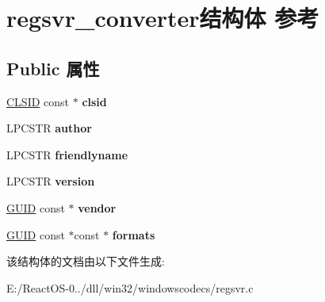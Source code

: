 \hypertarget{structregsvr__converter}{}\section{regsvr\+\_\+converter结构体 参考}
\label{structregsvr__converter}
\subsection*{Public 属性}
\begin{DoxyCompactItemize}
\item 
\mbox{\label{structregsvr__converter_af1c59fced290455be06f327f08106593}} 
\hyperlink{struct___i_i_d}{C\+L\+S\+ID} const  $\ast$ {\bfseries clsid}
\item 
\mbox{\label{structregsvr__converter_a3e6404e6264b00d4ccb28010d00ecdde}} 
L\+P\+C\+S\+TR {\bfseries author}
\item 
\mbox{\label{structregsvr__converter_ac96618e756b82cc919429cf492984a81}} 
L\+P\+C\+S\+TR {\bfseries friendlyname}
\item 
\mbox{\label{structregsvr__converter_a6bc5b746bdb5a6b4dfba9e1107fe22a5}} 
L\+P\+C\+S\+TR {\bfseries version}
\item 
\mbox{\label{structregsvr__converter_a77a91f97f7fcf1a7470c7304fdfd4e98}} 
\hyperlink{interface_g_u_i_d}{G\+U\+ID} const  $\ast$ {\bfseries vendor}
\item 
\mbox{\label{structregsvr__converter_ae4e9a44dd6073f6ccdb3f3cb51ad591e}} 
\hyperlink{interface_g_u_i_d}{G\+U\+ID} const  $\ast$const  $\ast$ {\bfseries formats}
\end{DoxyCompactItemize}


该结构体的文档由以下文件生成\+:\begin{DoxyCompactItemize}
\item 
E\+:/\+React\+O\+S-\/0../dll/win32/windowscodecs/regsvr.\+c\end{DoxyCompactItemize}
